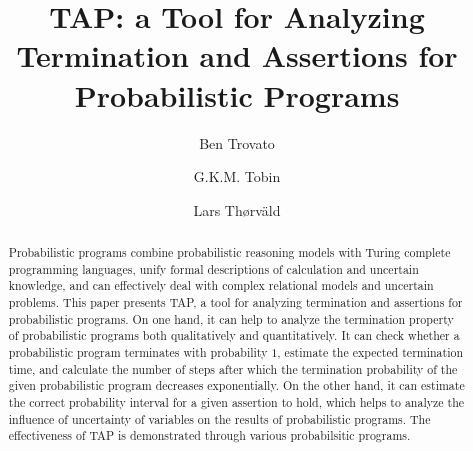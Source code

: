 \documentclass[sigconf,review, anonymous]{acmart}
\begin{document}
\title{TAP: a Tool for Analyzing Termination and Assertions for Probabilistic Programs}


\author{Ben Trovato}

\author{G.K.M. Tobin}

\author{Lars Th{\o}rv{\"a}ld}

\renewcommand{\shortauthors}{B. Trovato et al.}


\begin{abstract}
  Probabilistic programs combine probabilistic reasoning models with Turing complete programming languages, unify formal descriptions of calculation and uncertain knowledge, and can effectively deal with complex relational models and uncertain problems. This paper presents TAP, a  tool  for analyzing termination and assertions for probabilistic programs. On one hand, it can help to analyze the termination property of  probabilistic programs both qualitatively and quantitatively. It can check whether a probabilistic program terminates with probability $1$,  estimate the expected termination time, and calculate the number of steps after which the termination probability of the given probabilistic program decreases exponentially.  On the other hand, it can estimate the correct probability interval for a given assertion to hold, which helps to analyze the influence of uncertainty of variables on the results of probabilistic programs.
The effectiveness of TAP is demonstrated through various probabilsitic programs.
\end{abstract}
\end{document}
